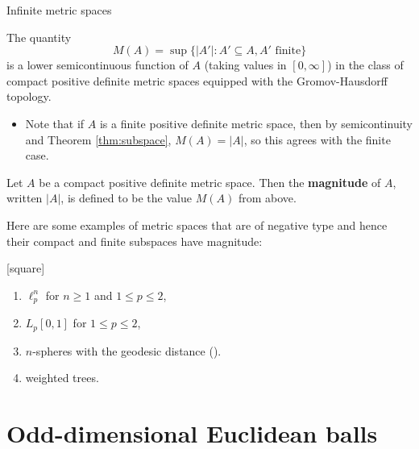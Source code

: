 \documentclass[12pt]{beamer}
\begin{document}
\begin{frame}[allowframebreaks]{Infinite metric spaces}
\framebreak

\begin{theorem}
The quantity
\begin{equation*}
M(A) = \sup\{\vert A'\vert : A' \subseteq A, \text{$A'$ finite}\}
\end{equation*}
is a lower semicontinuous function of $A$ (taking values in $[0,\infty]$) in the class of compact positive definite metric spaces equipped with the Gromov-Hausdorff topology.
\end{theorem}

\begin{itemize}
\item Note that if $A$ is a finite positive definite metric space, then by semicontinuity and Theorem \ref{thm:subspace}, $M(A) = \vert A \vert$, so this agrees with the finite case.
\end{itemize}

\framebreak

\begin{definition}
Let $A$ be a compact positive definite metric space. Then the \textbf{magnitude} of $A$, written $\vert A \vert$, is defined to be the value $M(A)$ from above.
\end{definition}

\framebreak

Here are some examples of metric spaces that are of negative type and hence their compact and finite subspaces have magnitude:

\begin{example}
[square]
\begin{enumerate}
\item $\ell_p^n$ for $n \geq 1$ and $1\leq p \leq 2$,
\item $L_p[0,1]$ for $1 \leq p \leq 2$,
\item $n$-spheres with the geodesic distance (\cite{willerton_magnitude_2014}).
\item weighted trees.
\end{enumerate}
\end{example}

\end{frame}

\section{Odd-dimensional Euclidean balls}
\end{document}
